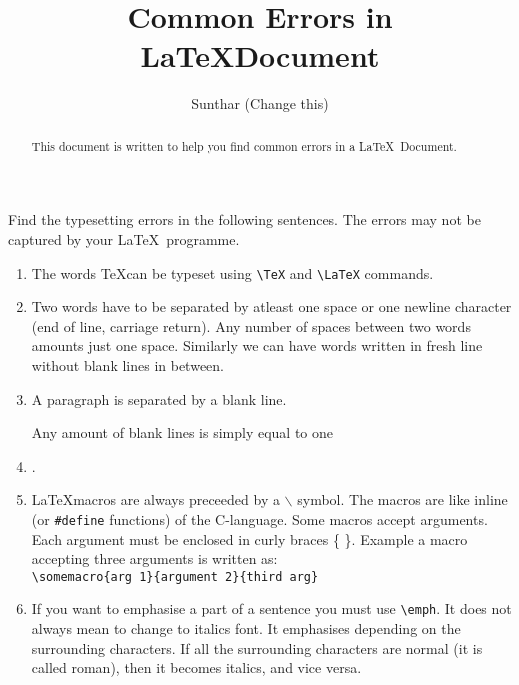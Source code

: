 \documentclass{article}
\begin{document}
\title{Common Errors in \LaTeX Document}
\author{Sunthar (Change this)}
\maketitle


\begin{abstract}
  This document is written to help you find common errors in a \LaTeX\ Document. 
\end{abstract}


Find the typesetting errors in the following sentences. The errors may
not be captured by your \LaTeX\ programme.
\begin{enumerate}

\item The words \TeX\Latex can be typeset using \verb|\TeX| and
\verb|\LaTeX| commands.


\item Two words have to be separated by atleast one space or one
  newline character (end of line, carriage return). 
                   Any      number       of   spaces
between       two        words      amounts     just one space.
Similarly 
we 
can
have
words
written
in fresh
line
without
blank 
lines
in between.


\item A paragraph is separated by a blank line.  




            Any amount of blank lines is simply equal to one \item.



\item \LaTeX macros are always preceeded by a $\backslash$ symbol.  The
  macros are like inline (or \verb|#define| functions) of the
  C-language.  Some macros accept arguments. Each argument must be
  enclosed in curly braces \{ \}.  Example a macro accepting three
  arguments is written as:\\
  \verb|\somemacro{arg 1}{argument 2}{third arg}|






\item If you want to emphasise a part of a sentence you must use
  \verb|\emph|.  It does not always mean to change to italics font.
  It emphasises depending on the surrounding characters.  If all the
  surrounding characters are normal (it is called roman), then it
  becomes italics, and vice versa.
  

\end{enumerate}
\end{document}
